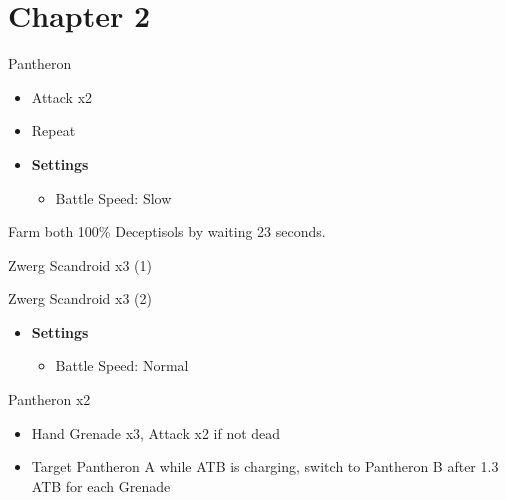 \chapter{Chapter 2}

	\begin{battle}[0:10]{Pantheron}
		\begin{itemize}
			\item Attack x2
			\item Repeat
		\end{itemize}
	\end{battle}

	\begin{menu}
		\begin{itemize}
			\item \textbf{Settings}
			      \begin{itemize}
				      \item Battle Speed: Slow
			      \end{itemize}
		\end{itemize}
	\end{menu}

	Farm both 100\% Deceptisols by waiting 23 seconds.
	\begin{battle}[0:23]{Zwerg Scandroid x3 (1)}
	\end{battle}

	\begin{battle}[0:23]{Zwerg Scandroid x3 (2)}
	\end{battle}

	\begin{menu}
		\begin{itemize}
			\item \textbf{Settings}
			      \begin{itemize}
				      \item Battle Speed: Normal
			      \end{itemize}
		\end{itemize}
	\end{menu}

	\begin{battle}[0:16]{Pantheron x2}
		\begin{itemize}
			\item Hand Grenade x3, Attack x2 if not dead
			\item Target Pantheron A while ATB is charging, switch to Pantheron B after 1.3 ATB for each Grenade
		\end{itemize}
	\end{battle}

